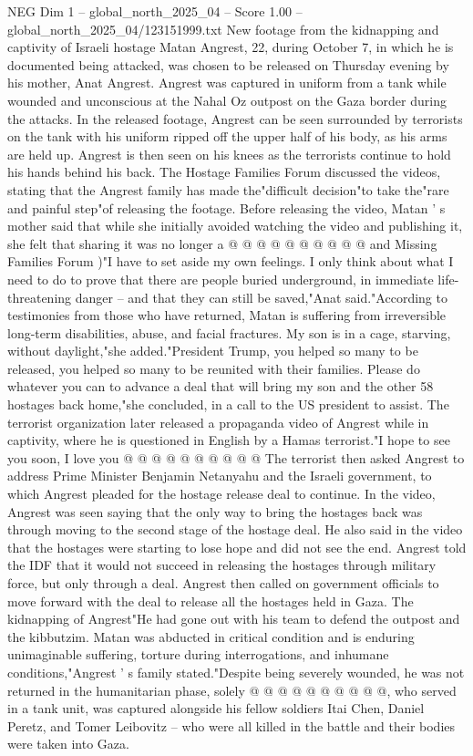 \begin{textsample}{NEG Dim 1 – global\_north\_2025\_04 – Score 1.00 – global\_north\_2025\_04/123151999.txt}  \label{ex:f1_neg_046}
New footage from the kidnapping and captivity of Israeli hostage Matan Angrest, 22, during October 7, in which he is documented being attacked, was chosen to be released on Thursday evening by his mother, Anat Angrest.
Angrest was captured in uniform from a tank while wounded and unconscious at the Nahal Oz outpost on the Gaza border during the attacks.
In the released footage, Angrest can be seen surrounded by terrorists on the tank with his uniform ripped off the upper half of his body, as his arms are held up.
Angrest is then seen on his knees as the terrorists continue to hold his hands behind his back.
The Hostage Families Forum discussed the videos, stating that the Angrest family has made the"difficult decision"to take the"rare and painful step"of releasing the footage.
Before releasing the video, Matan ' s mother said that while she initially avoided watching the video and publishing it, she felt that sharing it was no longer a @ @ @ @ @ @ @ @ @ @ and Missing Families Forum )"I have to set aside my own feelings.
I only think about what I need to do to prove that there are people buried underground, in immediate life-threatening danger -- and that they can still be saved,"Anat said."According to testimonies from those who have returned, Matan is suffering from irreversible long-term disabilities, abuse, and facial fractures.
My son is in a cage, starving, without daylight,"she added."President Trump, you helped so many to be released, you helped so many to be reunited with their families.
Please do whatever you can to advance a deal that will bring my son and the other 58 hostages back home,"she concluded, in a call to the US president to assist.
The terrorist organization later released a propaganda video of Angrest while in captivity, where he is questioned in English by a Hamas terrorist."I hope to see you soon, I love you @ @ @ @ @ @ @ @ @ @ The terrorist then asked Angrest to address Prime Minister Benjamin Netanyahu and the Israeli government, to which Angrest pleaded for the hostage release deal to continue.
In the video, Angrest was seen saying that the only way to bring the hostages back was through moving to the second stage of the hostage deal.
He also said in the video that the hostages were starting to lose hope and did not see the end.
Angrest told the IDF that it would not succeed in releasing the hostages through military force, but only through a deal.
Angrest then called on government officials to move forward with the deal to release all the hostages held in Gaza.
The kidnapping of Angrest"He had gone out with his team to defend the outpost and the kibbutzim.
Matan was abducted in critical condition and is enduring unimaginable suffering, torture during interrogations, and inhumane conditions,"Angrest ' s family stated."Despite being severely wounded, he was not returned in the humanitarian phase, solely @ @ @ @ @ @ @ @ @ @, who served in a tank unit, was captured alongside his fellow soldiers Itai Chen, Daniel Peretz, and Tomer Leibovitz -- who were all killed in the battle and their bodies were taken into Gaza.

\end{textsample}
